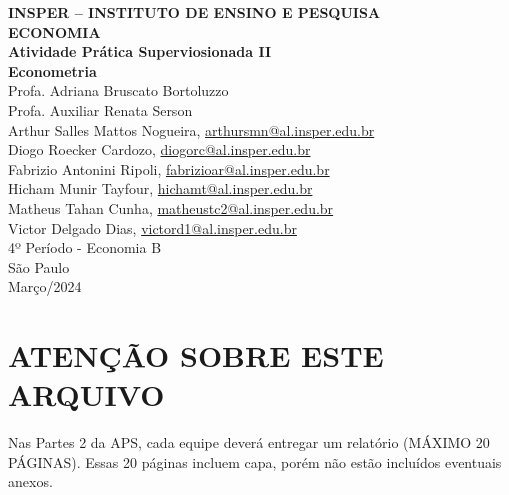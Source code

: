\documentclass[12pt]{article}
\begin{document}
\begin{titlepage}
    \centering
    \vspace*{1cm}
    \Large\textbf{INSPER – INSTITUTO DE ENSINO E PESQUISA}\\
    \Large \textbf{ECONOMIA}\\
    \vspace{1.5cm}
    \Large\textbf{Atividade Prática Superviosionada II}\\
    \textbf{Econometria}\\
    \vspace{1.5cm}
    Profa. Adriana Bruscato Bortoluzzo\\
    Profa. Auxiliar Renata Serson \\
    \vfill
    \normalsize
    Arthur Salles Mattos Nogueira, \href{mailto:arthursmn@al.insper.edu.br}
    {arthursmn@al.insper.edu.br}\\
    Diogo Roecker Cardozo, \href{mailto:diogorc@al.insper.edu.br}
    {diogorc@al.insper.edu.br}\\
    Fabrizio Antonini Ripoli, \href{mailto:fabrizioar@al.insper.edu.br}{fabrizioar@al.insper.edu.br}\\
    Hicham Munir Tayfour, \href{mailto:hichamt@al.insper.edu.br}{hichamt@al.insper.edu.br}\\
    Matheus Tahan Cunha, \href{mailto:matheustc2@al.insper.edu.br}
    {matheustc2@al.insper.edu.br}\\
    Victor Delgado Dias, \href{mailto:victord1@al.insper.edu.br}
    {victord1@al.insper.edu.br}\\
    4º Período - Economia B\\
    \vfill
    São Paulo\\
    Março/2024
\end{titlepage}

\newpage
\tableofcontents
\thispagestyle{empty} %
\newpage
\setcounter{page}{1} %
\justify
\onehalfspacing

\pagestyle{fancy}
\fancyhf{}
\rhead{\thepage}

\section{\textbf{ATENÇÃO SOBRE ESTE ARQUIVO}}
Nas Partes 2 da APS, cada equipe deverá entregar um relatório (MÁXIMO 
20 PÁGINAS). Essas 20 páginas incluem capa, porém não estão incluídos eventuais 
anexos.
\end{document}
